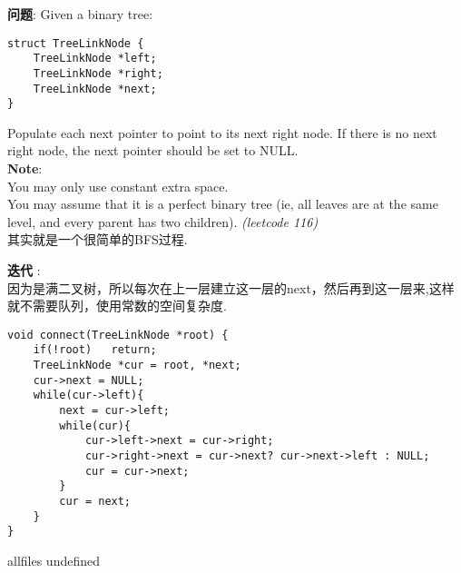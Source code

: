 \documentclass{article}
\begin{document}
\begin{CJK}{UTF8}{gbsn}     %

\else
	
\begin{description}
	\item{\textbf{问题}}: Given a binary tree:
	\begin{lstlisting}
struct TreeLinkNode {
    TreeLinkNode *left;
    TreeLinkNode *right;
	TreeLinkNode *next;
}
	\end{lstlisting}
	Populate each next pointer to point to its next right node. If there is no next right node, the next pointer should be set to NULL. 
	\\\textbf{Note}:
	\\You may only use constant extra space.
	\\You may assume that it is a perfect binary tree (ie, all leaves are at the same level, and every parent has two children).
	\textit{(leetcode 116)}
	\\其实就是一个很简单的BFS过程.
	\item{\textbf{迭代}} : 
	\\因为是满二叉树，所以每次在上一层建立这一层的next，然后再到这一层来,这样就不需要队列，使用常数的空间复杂度.
	\begin{lstlisting}
void connect(TreeLinkNode *root) {
	if(!root)	return;
	TreeLinkNode *cur = root, *next;
	cur->next = NULL;
	while(cur->left){
		next = cur->left;
		while(cur){
			cur->left->next = cur->right;
			cur->right->next = cur->next? cur->next->left : NULL;
			cur = cur->next;
		}
		cur = next;
	}
}
	\end{lstlisting}
\end{description}

\fi

\ifx allfiles undefined
\end{CJK}
\end{document}
